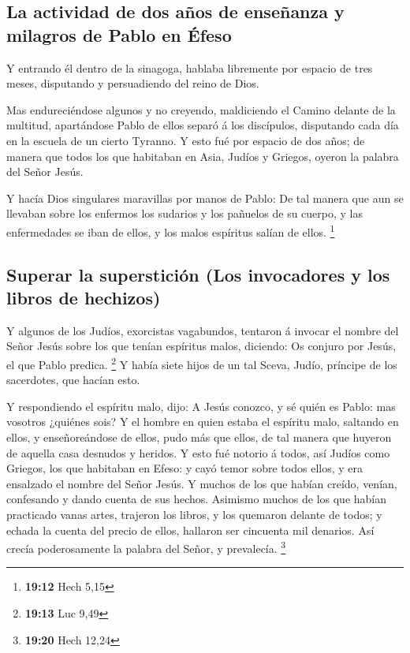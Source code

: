 \hypertarget{la-actividad-de-dos-auxf1os-de-enseuxf1anza-y-milagros-de-pablo-en-uxe9feso}{%
\subsection{La actividad de dos años de enseñanza y milagros de Pablo en
Éfeso}\label{la-actividad-de-dos-auxf1os-de-enseuxf1anza-y-milagros-de-pablo-en-uxe9feso}}

 Y entrando él dentro de la sinagoga, hablaba libremente por
espacio de tres meses, disputando y persuadiendo del reino de Dios.

 Mas endureciéndose algunos y no creyendo, maldiciendo el
Camino delante de la multitud, apartándose Pablo de ellos separó á los
discípulos, disputando cada día en la escuela de un cierto Tyranno.
 Y esto fué por espacio de dos años; de manera que todos
los que habitaban en Asia, Judíos y Griegos, oyeron la palabra del Señor
Jesús.

 Y hacía Dios singulares maravillas por manos de Pablo:
 De tal manera que aun se llevaban sobre los enfermos los
sudarios y los pañuelos de su cuerpo, y las enfermedades se iban de
ellos, y los malos espíritus salían de ellos. \footnote{\textbf{19:12}
  Hech 5,15}

\hypertarget{superar-la-supersticiuxf3n-los-invocadores-y-los-libros-de-hechizos}{%
\subsection{Superar la superstición (Los invocadores y los libros de
hechizos)}\label{superar-la-supersticiuxf3n-los-invocadores-y-los-libros-de-hechizos}}

 Y algunos de los Judíos, exorcistas vagabundos, tentaron á
invocar el nombre del Señor Jesús sobre los que tenían espíritus malos,
diciendo: Os conjuro por Jesús, el que Pablo predica. \footnote{\textbf{19:13}
  Luc 9,49}  Y había siete hijos de un tal Sceva, Judío,
príncipe de los sacerdotes, que hacían esto.

 Y respondiendo el espíritu malo, dijo: A Jesús conozco, y
sé quién es Pablo: mas vosotros ¿quiénes sois?  Y el hombre
en quien estaba el espíritu malo, saltando en ellos, y enseñoreándose de
ellos, pudo más que ellos, de tal manera que huyeron de aquella casa
desnudos y heridos.  Y esto fué notorio á todos, así Judíos
como Griegos, los que habitaban en Efeso: y cayó temor sobre todos
ellos, y era ensalzado el nombre del Señor Jesús.  Y muchos
de los que habían creído, venían, confesando y dando cuenta de sus
hechos.  Asimismo muchos de los que habían practicado vanas
artes, trajeron los libros, y los quemaron delante de todos; y echada la
cuenta del precio de ellos, hallaron ser cincuenta mil denarios.
 Así crecía poderosamente la palabra del Señor, y
prevalecía. \footnote{\textbf{19:20} Hech 12,24}


